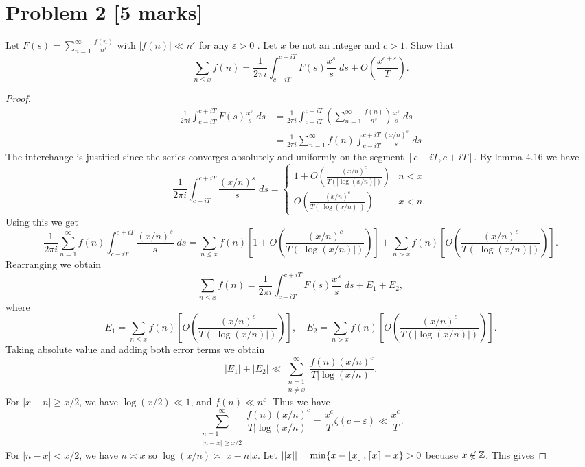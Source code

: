 \documentclass[12pt]{article}
\begin{document}
\section*{Problem 2 [5 marks]} 
Let $F(s)=\sum_{n=1}^{\infty}\frac{f(n)}{n^s}$ with $|f(n)|\ll n^{\varepsilon}$ for any $\varepsilon>0$ . Let $x$ be not an integer and $c>1$.  Show that 
\[
    \sum_{n\leq x}f(n)=\frac{1}{2\pi i}\int_{c-iT}^{c+iT}F(s)\frac{x^s}{s}\;ds+O\left(\frac{x^{c+\varepsilon}}{T}\right).
\]
\begin{proof}
    \begin{align*}
        \frac{1}{2\pi i}\int_{c-iT}^{c+iT}F(s)\frac{x^s}{s}\;ds&=\frac{1}{2\pi i}\int_{c-iT}^{c+iT}\left(\sum_{n=1}^{\infty}\frac{f(n)}{n^s}\right)\frac{x^s}{s}\;ds\\
        &=\frac{1}{2\pi i}\sum_{n=1}^{\infty}f(n)\int_{c-iT}^{c+iT}\frac{(x/n)^s}{s}\;ds
    \end{align*}
    The interchange is justified since the series converges absolutely and uniformly on the segment $[c-iT,c+iT]$. By lemma 4.16 we have
    \[
        \frac{1}{2\pi i}\int_{c-iT}^{c+iT}\frac{(x/n)^s}{s}\;ds=
        \begin{cases}
            1+O\left(\frac{(x/n)^c}{T(|\log(x/n)|)}\right)&n<x\\
            O\left(\frac{(x/n)^c}{T(|\log(x/n)|)}\right)&x<n.
        \end{cases}
    \]
    Using this we get
    \[
        \frac{1}{2\pi i}\sum_{n=1}^{\infty}f(n)\int_{c-iT}^{c+iT}\frac{(x/n)^s}{s}\;ds=\sum_{n\leq x}f(n)\left[1+O\left(\frac{(x/n)^c}{T(|\log(x/n)|)}\right)\right]+\sum_{n>x}f(n)\left[O\left(\frac{(x/n)^c}{T(|\log(x/n)|)}\right)\right].
    \]
    Rearranging we obtain
    \[
        \sum_{n\leq x}f(n)=\frac{1}{2\pi i}\int_{c-iT}^{c+iT}F(s)\frac{x^s}{s}\;ds+E_1+E_2,
    \]
    where
    \[
        E_1=\sum_{n\leq x}f(n)\left[O\left(\frac{(x/n)^c}{T(|\log(x/n)|)}\right)\right],\quad E_2=\sum_{n>x}f(n)\left[O\left(\frac{(x/n)^c}{T(|\log(x/n)|)}\right)\right].
    \]
    Taking absolute value and adding both error terms we obtain 
    \[
        |E_1|+|E_2|\ll\sum_{\substack{n=1\\n\neq x}}^{\infty}\frac{f(n)(x/n)^c}{T|\log(x/n)|}.
    \]
    For $|x-n|\geq x/2$, we have $\log(x/2)\ll1$, and $f(n)\ll n^\varepsilon$. Thus we have
    \[
        \sum_{\substack{n=1\\|n-x|\geq x/2}}^{\infty}\frac{f(n)(x/n)^c}{T|\log(x/n)|}=\frac{x^c}{T}\zeta(c-\varepsilon)\ll\frac{x^c}{T}.
    \]
    For $|n-x|<x/2$, we have $n\asymp x$ so $\log(x/n)\asymp|x-n|x$. Let $||x||=\min\{x-\left\lfloor x \right\rfloor,\lceil x\rceil-x\}>0$ becuase $x\not\in\mathbb{Z}$. This gives

\end{proof}
\end{document}
